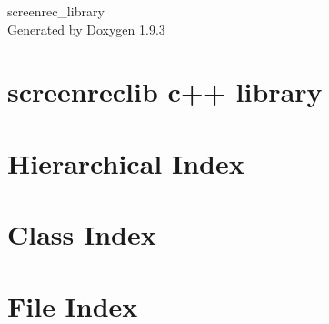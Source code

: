 \documentclass[twoside]{book}
\newcommand{\+}{\discretionary{\mbox{\scriptsize$\hookleftarrow$}}{}{}}
\newcommand{\clearemptydoublepage}{%
    \newpage{\pagestyle{empty}\cleardoublepage}%
  }
\begin{document}
  \raggedbottom
    \hypersetup{pageanchor=false,
                bookmarksnumbered=true,
                pdfencoding=unicode
               }
  \begin{titlepage}
  \vspace*{7cm}
  \begin{center}%
  {\Large screenrec\+\_\+library}\\
  \vspace*{1cm}
  {\large Generated by Doxygen 1.9.3}\\
  \end{center}
  \end{titlepage}
  \clearemptydoublepage
  \tableofcontents
  \clearemptydoublepage
  \hypersetup{pageanchor=true}
\chapter{screenreclib c++ library}
\label{md___users_giuliocarota__c_lion_projects_screenreclib__r_e_a_d_m_e}

\chapter{Hierarchical Index}

\chapter{Class Index}

\chapter{File Index}

\end{document}
